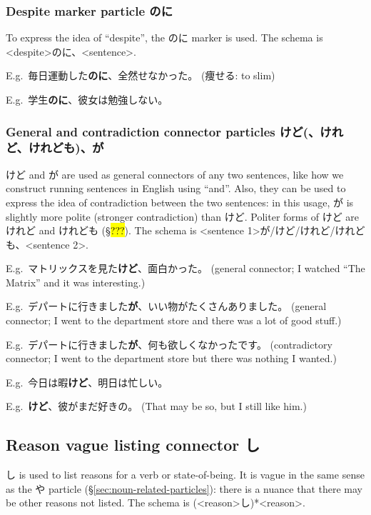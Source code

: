 \documentclass[../nihongo-gakushuu-kyouzai.tex]{subfiles}
\begin{document}
\subsubsection{Despite marker particle のに} \label{sec:despite-marker-particle}
To express the idea of ``despite'', the のに marker is used. The schema is <despite>のに、<sentence>.

E.g.\ 毎日運動した\textbf{のに}、全然せなかった。 (痩せる: to slim)


E.g.\ 学生\textbf{のに}、彼女は勉強しない。

\subsubsection{General and contradiction connector particles けど(、けれど、けれども)、が} \label{sec:general-and-contradiction-connector-particles}
けど and が are used as general connectors of any two sentences, like how we construct running sentences in English using ``and''. Also, they can be used to express the idea of contradiction between the two sentences: in this usage, が is slightly more polite (stronger contradiction) than けど. Politer forms of けど are けれど and けれども (\S\hl{???}). The schema is <sentence 1>が/けど/けれど/けれども、<sentence 2>.

E.g.\ マトリックスを見た\textbf{けど}、面白かった。 (general connector; I watched ``The Matrix'' and it was interesting.)

E.g.\ デパートに行きました\textbf{が}、いい物がたくさんありました。 (general connector; I went to the department store and there was a lot of good stuff.)

E.g.\ デパートに行きました\textbf{が}、何も欲しくなかったです。 (contradictory connector; I went to the department store but there was nothing I wanted.)


E.g.\ 今日は暇\textbf{けど}、明日は忙しい。

E.g.\ \textbf{けど}、彼がまだ好きの。 (That may be so, but I still like him.)

\subsection{Reason vague listing connector し} \label{sec:reason-vague-listing-connector}
し is used to list reasons for a verb or state-of-being. It is vague in the same sense as the や particle (\S\ref{sec:noun-related-particles}): there is a nuance that there may be other reasons not listed. The schema is (<reason>し)*<reason>.
\end{document}
